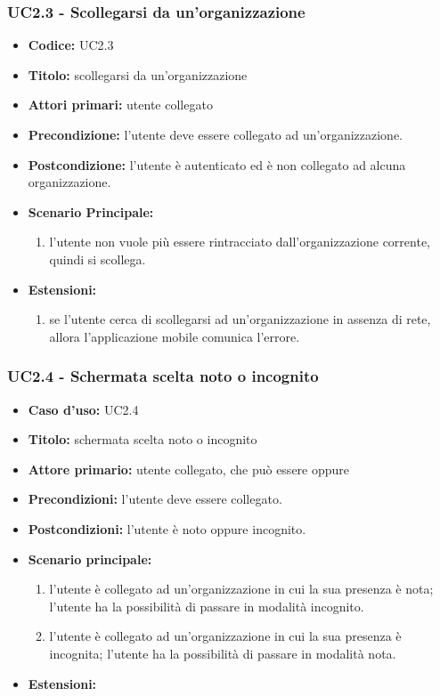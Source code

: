 \documentclass[casi-duso]{subfiles}
\begin{document}
\subsubsection{UC2.3 - Scollegarsi da un'organizzazione}
\label{subsub:uc2.3utente}
\begin{itemize}
  \item \textbf{Codice:} UC2.3
  \item \textbf{Titolo:} scollegarsi da un'organizzazione
  \item \textbf{Attori primari:} utente collegato 
  \item \textbf{Precondizione:} l'utente deve essere collegato ad un'organizzazione.
  \item \textbf{Postcondizione:} l'utente è autenticato ed è non collegato ad alcuna organizzazione.
  \item \textbf{Scenario Principale:}
  \begin{enumerate}
    \item l'utente non vuole più essere rintracciato dall'organizzazione corrente, quindi si scollega.
  \end{enumerate}
  \item \textbf{Estensioni:} 
  \begin{enumerate}
    \item se l'utente cerca di scollegarsi ad un'organizzazione in assenza di rete, allora l'applicazione mobile comunica l'errore.
  \end{enumerate}
\end{itemize}

\subsubsection{UC2.4 - Schermata scelta noto o incognito}
\label{subsub:uc2.4utente}
\begin{itemize}
  \item \textbf{Caso d’uso:} UC2.4
  \item \textbf{Titolo:} schermata scelta noto o incognito
  \item \textbf{Attore primario:} utente collegato, che può essere  oppure 
  \item \textbf{Precondizioni:} l'utente deve essere collegato.
  \item \textbf{Postcondizioni:} l'utente è noto oppure incognito.
  \item \textbf{Scenario principale:} 
  \begin{enumerate}
    \item l'utente è collegato ad un'organizzazione in cui la sua presenza è nota; l'utente ha la possibilità di passare in modalità incognito.
    \item l'utente è collegato ad un'organizzazione in cui la sua presenza è incognita; l'utente ha la possibilità di passare in modalità nota.
  \end{enumerate}
  \item \textbf{Estensioni:} 
\end{itemize}
\end{document}
